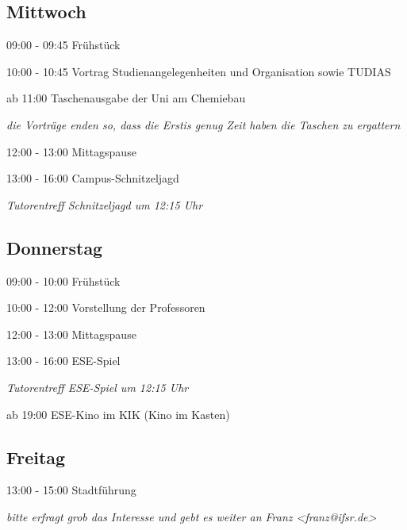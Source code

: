 \documentclass[a4paper,12pt]{report}
\begin{document}
\subsection{Mittwoch}
\begin{itemize*}
\item 09:00 - 09:45 Frühstück
\item 10:00 - 10:45 Vortrag Studienangelegenheiten und Organisation sowie TUDIAS
\item ab 11:00 Taschenausgabe der Uni am Chemiebau
\begin{itemize*}
  \item \small{\textit{die Vorträge enden so, dass die Erstis genug Zeit haben die Taschen zu ergattern}}
\end{itemize*}
\item 12:00 - 13:00 Mittagspause
\item 13:00 - 16:00 Campus-Schnitzeljagd
\begin{itemize*}
  \item \small{\textit{Tutorentreff Schnitzeljagd um 12:15 Uhr}}
\end{itemize*}
\end{itemize*}

\subsection{Donnerstag}
\begin{itemize*}
\item 09:00 - 10:00 Frühstück
\item 10:00 - 12:00 Vorstellung der Professoren
\item 12:00 - 13:00 Mittagspause
\item 13:00 - 16:00 ESE-Spiel
\begin{itemize*}
  \item \small{\textit{Tutorentreff ESE-Spiel um 12:15 Uhr}}
\end{itemize*}
\item ab 19:00 ESE-Kino im KIK (Kino im Kasten)
\end{itemize*}

\subsection{Freitag}
\begin{itemize*}
\item 13:00 - 15:00 Stadtführung
\begin{itemize*}
  \item \small{\textit{bitte erfragt grob das Interesse und gebt es weiter an Franz <franz@ifsr.de>}}
\end{itemize*}
\end{itemize*}
\end{document}
